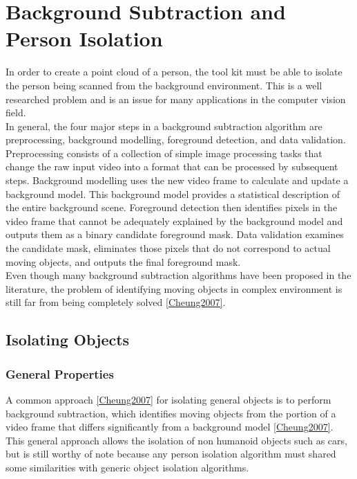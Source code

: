 \section{Background Subtraction and Person Isolation}
\label{background subtraction and person isolation}
In order to create a point cloud of a person, the tool kit must be able to isolate the person being scanned from the background environment. This is a well researched problem and is an issue for many applications in the computer vision field. \\

In general, the four major steps in a background subtraction algorithm are preprocessing, background modelling, foreground detection, and data validation.
Preprocessing consists of a collection of simple image processing tasks that change the raw input video into a format that can be processed by subsequent steps. 
Background modelling uses the new video frame to calculate and update a background
model. This background model provides a statistical description of the entire background scene. 
Foreground detection then identifies pixels in the video frame that cannot be adequately explained by the background model and outputs them as a binary candidate foreground mask. 
Data validation examines the candidate mask, eliminates those pixels that do not correspond to actual moving objects, and outputs the final foreground mask.\\

Even though many background subtraction algorithms have been proposed in the literature, the problem of identifying moving objects in complex environment is still far from being completely solved \ref{Cheung2007}.\\

\subsection{Isolating Objects}
\label{isolating objects}

\subsubsection{General Properties}
A common approach \ref{Cheung2007} for isolating general objects is to perform background subtraction, which identifies moving objects from the portion of a video frame that differs significantly from a background model \ref{Cheung2007}.
This general approach allows the isolation of non humanoid objects such as cars, but is still worthy of note because any person isolation algorithm must shared some similarities with generic object isolation algorithms.\\

